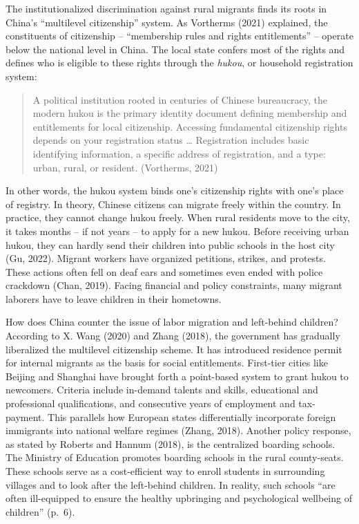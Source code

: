 \documentclass[
  man,floatsintext]{apa7}
\begin{document}
The institutionalized discrimination against rural migrants finds its roots in China's ``multilevel citizenship'' system. As Vortherms (2021) explained, the constituents of citizenship -- ``membership rules and rights entitlements'' -- operate below the national level in China. The local state confers most of the rights and defines who is eligible to these rights through the \emph{hukou}, or household registration system:

\begin{quote}
A political institution rooted in centuries of Chinese bureaucracy, the modern hukou is the primary identity document defining membership and entitlements for local citizenship. Accessing fundamental citizenship rights depends on your registration status \ldots{} Registration includes basic identifying information, a specific address of registration, and a type: urban, rural, or resident. (Vortherms, 2021)
\end{quote}

In other words, the hukou system binds one's citizenship rights with one's place of registry. In theory, Chinese citizens can migrate freely within the country. In practice, they cannot change hukou freely. When rural residents move to the city, it takes months -- if not years -- to apply for a new hukou. Before receiving urban hukou, they can hardly send their children into public schools in the host city (Gu, 2022). Migrant workers have organized petitions, strikes, and protests. These actions often fell on deaf ears and sometimes even ended with police crackdown (Chan, 2019). Facing financial and policy constraints, many migrant laborers have to leave children in their hometowns.

How does China counter the issue of labor migration and left-behind children? According to X. Wang (2020) and Zhang (2018), the government has gradually liberalized the multilevel citizenship scheme. It has introduced residence permit for internal migrants as the basis for social entitlements. First-tier cities like Beijing and Shanghai have brought forth a point-based system to grant hukou to newcomers. Criteria include in-demand talents and skills, educational and professional qualifications, and consecutive years of employment and tax-payment. This parallels how European states differentially incorporate foreign immigrants into national welfare regimes (Zhang, 2018). Another policy response, as stated by Roberts and Hannum (2018), is the centralized boarding schools. The Ministry of Education promotes boarding schools in the rural county-seats. These schools serve as a cost-efficient way to enroll students in surrounding villages and to look after the left-behind children. In reality, such schools ``are often ill-equipped to ensure the healthy upbringing and psychological wellbeing of children'' (p.~6).
\end{document}
